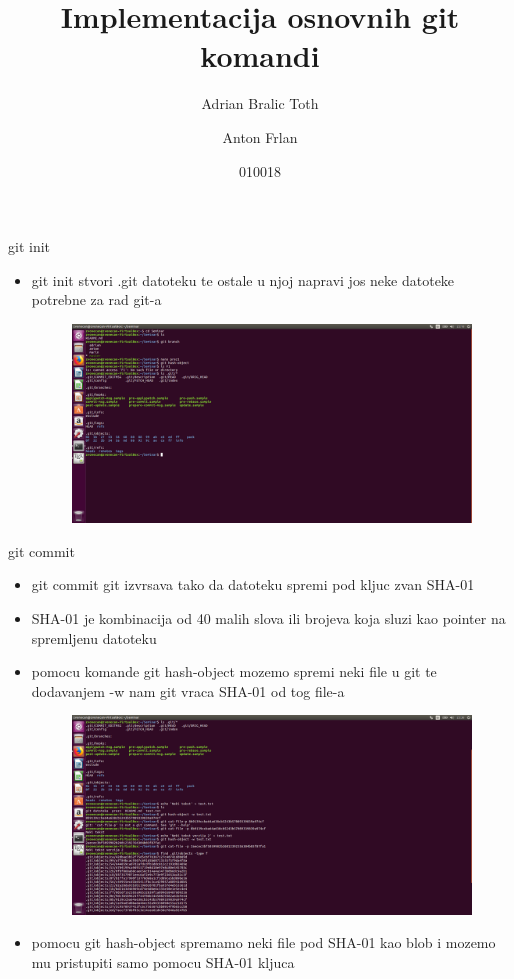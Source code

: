 \documentclass[]{beamer}
\title{Implementacija osnovnih git komandi}
\author{Adrian Bralic Toth \and Anton Frlan}
\institute{Tehnički Fakultet Rijeka}
\date{010018}
\begin{document}
\frame{\titlepage}

\begin{frame}{git init}

\begin{itemize}
	\setlength\itemsep{01em}
	\item git init stvori .git datoteku te ostale u njoj napravi jos neke datoteke potrebne za rad git-a
	\begin{figure}
\centering
\includegraphics[scale=.01]{./slike/git_datoteka.jpg}
\end{figure}
\end{itemize}

\end{frame}


\begin{frame}{git commit}

\begin{itemize}
	\setlength\itemsep{01.5em}
	\item git commit git izvrsava tako da datoteku spremi pod kljuc zvan SHA-01
	\item SHA-01 je kombinacija od 40 malih slova ili brojeva koja sluzi kao pointer na spremljenu datoteku
	\item pomocu komande git hash-object mozemo spremi neki file u git te dodavanjem -w nam git vraca SHA-01 od tog file-a
	\begin{figure}
\centering
\includegraphics[scale=.01]{./slike/druga_slika.jpg}
\end{figure}
	\item pomocu git hash-object spremamo neki file pod SHA-01 kao blob i mozemo mu pristupiti samo pomocu SHA-01 kljuca
\end{itemize}

\end{frame}
\end{document}
